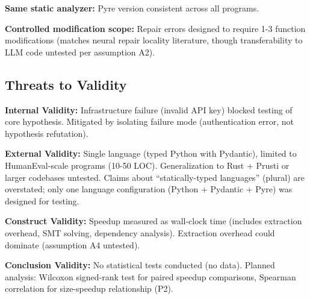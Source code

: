 \textbf{Same static analyzer:} Pyre version consistent across all programs.

\textbf{Controlled modification scope:} Repair errors designed to require 1-3 function modifications (matches neural repair locality literature, though transferability to LLM code untested per assumption A2).

\subsection{Threats to Validity}

\textbf{Internal Validity:} Infrastructure failure (invalid API key) blocked testing of core hypothesis. Mitigated by isolating failure mode (authentication error, not hypothesis refutation).

\textbf{External Validity:} Single language (typed Python with Pydantic), limited to HumanEval-scale programs (10-50 LOC). Generalization to Rust + Prusti or larger codebases untested. Claims about ``statically-typed languages'' (plural) are overstated; only one language configuration (Python + Pydantic + Pyre) was designed for testing.

\textbf{Construct Validity:} Speedup measured as wall-clock time (includes extraction overhead, SMT solving, dependency analysis). Extraction overhead could dominate (assumption A4 untested).

\textbf{Conclusion Validity:} No statistical tests conducted (no data). Planned analysis: Wilcoxon signed-rank test for paired speedup comparisons, Spearman correlation for size-speedup relationship (P2).
